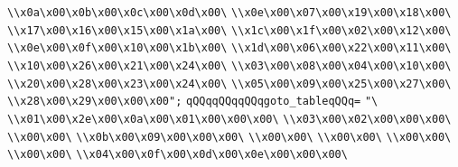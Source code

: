 \verb|\\x0a\x00\x0b\x00\x0c\x00\x0d\x00\|\newline
\verb|\\x0e\x00\x07\x00\x19\x00\x18\x00\|\newline
\verb|\\x17\x00\x16\x00\x15\x00\x1a\x00\|\newline
\verb|\\x1c\x00\x1f\x00\x02\x00\x12\x00\|\newline
\verb|\\x0e\x00\x0f\x00\x10\x00\x1b\x00\|\newline
\verb|\\x1d\x00\x06\x00\x22\x00\x11\x00\|\newline
\verb|\\x10\x00\x26\x00\x21\x00\x24\x00\|\newline
\verb|\\x03\x00\x08\x00\x04\x00\x10\x00\|\newline
\verb|\\x20\x00\x28\x00\x23\x00\x24\x00\|\newline
\verb|\\x05\x00\x09\x00\x25\x00\x27\x00\|\newline
\verb|\\x28\x00\x29\x00\x00\x00";|\newline
\verb|qQQqqQQqqQQqgoto_tableqQQq=|\newline
\verb|"\|\newline
\verb|\\x01\x00\x2e\x00\x0a\x00\x01\x00\x00\x00\|\newline
\verb|\\x03\x00\x02\x00\x00\x00\|\newline
\verb|\\x00\x00\|\newline
\verb|\\x0b\x00\x09\x00\x00\x00\|\newline
\verb|\\x00\x00\|\newline
\verb|\\x00\x00\|\newline
\verb|\\x00\x00\|\newline
\verb|\\x00\x00\|\newline
\verb|\\x04\x00\x0f\x00\x0d\x00\x0e\x00\x00\x00\|\newline
